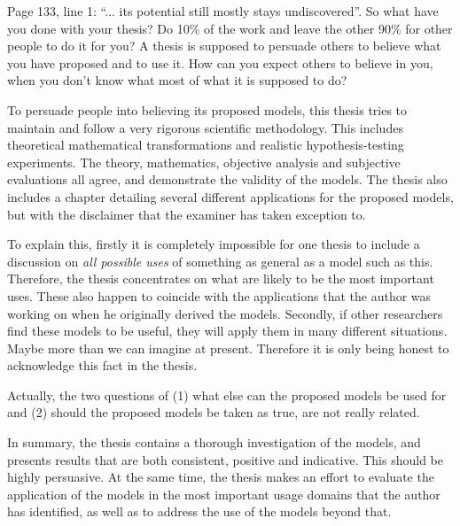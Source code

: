 \replyToComment
    {
      Page 133, line 1: ``... its potential still mostly stays undiscovered''.
      So what have you done with your thesis?
      Do 10\% of the work and leave the other 90\% for other people to do it for you?
      A thesis is supposed to persuade others to believe what you have proposed and to use it.
      How can you expect others to believe in you, when you don't know what most of what it is supposed to do?
    }
    {
     To persuade people into believing its proposed models, this thesis tries to maintain and follow a very rigorous scientific methodology. 
     This includes theoretical mathematical transformations and realistic hypothesis-testing experiments.
     The theory, mathematics, objective analysis and subjective evaluations all agree, and demonstrate the validity of the models.
      The thesis also includes a chapter detailing several different applications for the proposed models, but with the disclaimer that the examiner has taken exception to.
      
      To explain this, firstly it is completely impossible for one thesis to include a discussion on \textit{all possible uses} of something as general as a model such as this. Therefore, the thesis concentrates on what are likely to be the most important uses. These also happen to coincide with the applications that the author was working on when he originally derived the models.
      Secondly, if other researchers find these models to be useful, they will apply them in many different situations. Maybe more than we can imagine at present. Therefore it is only being honest to acknowledge this fact in the thesis.

Actually, the two questions of (1) what else can the proposed models be used for and (2) should the proposed models be taken as true, are not really related.

In summary, the thesis contains a thorough investigation of the models, and presents results that are both consistent, positive and indicative. This should be highly persuasive.
At the same time, the thesis makes an effort to evaluate the application of the models in the most important usage domains that the author has identified, as well as to address the use of the models beyond that.
    }

